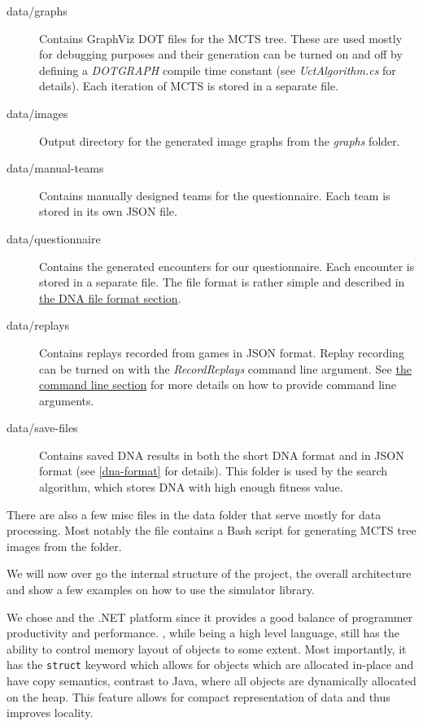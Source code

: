 \begin{description}
	\item[data/graphs] Contains GraphViz DOT \citep{graphviz} files for the MCTS tree. These are used mostly for debugging purposes and their generation can be turned on and off by defining a \emph{DOTGRAPH} compile time constant (see \emph{UctAlgorithm.cs} for details). Each iteration of MCTS is stored in a separate file.
	\item[data/images] Output directory for the generated image graphs from the \emph{graphs} folder.
	\item[data/manual-teams] Contains manually designed teams for the questionnaire. Each team is stored in its own JSON \citep{json} file.
	\item[data/questionnaire] Contains the generated encounters for our questionnaire. Each encounter is stored
	in a separate file. The file format is rather simple and described in \hyperref[dna-format]{the DNA file format section}.
	\item[data/replays] Contains replays recorded from games in JSON format. Replay recording can be turned on with the \emph{RecordReplays} command line argument. See \hyperref[cmd-args]{the command line section} for more details on how to provide command line arguments.
	\item[data/save-files] Contains saved DNA results in both the short DNA format and in JSON format (see \autoref{dna-format} for details). This folder is used by the search algorithm, which stores DNA with high enough fitness value.
\end{description}

There are also a few misc files in the data folder that serve mostly for data processing. Most notably the  file contains a Bash \citep{bash} script for generating MCTS tree images from the  folder.

We will now over go the internal structure of the project, the overall architecture and show a few examples on how to use the simulator library.

We chose \Csh{} and the .NET platform since it provides a good balance of programmer productivity and performance. \Csh{}, while being a high level language, still has the ability to control memory layout of objects to some extent. Most importantly, it has the \verb|struct| keyword which allows for objects which are allocated in-place and have copy semantics, contrast to Java, where all objects are dynamically allocated on the heap. This feature allows for compact representation of data and thus improves locality.

